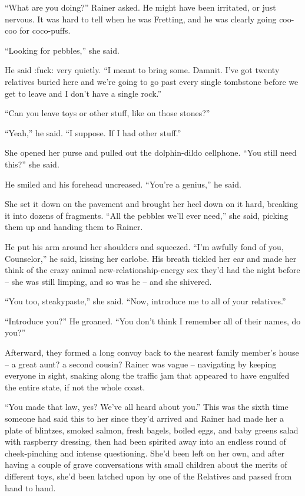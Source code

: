 “What are you doing?” Rainer asked. He might have been irritated, 
or just nervous. It was hard to tell when he was Fretting, and he was 
clearly going coo-coo for coco-puffs.

“Looking for pebbles,” she said.

He said :fuck: very quietly. “I meant to bring some. Damnit. I've got 
twenty relatives buried here and we're going to go past every single 
tombstone before we get to leave and I don't have a single rock.”

“Can you leave toys or other stuff, like on those stones?”

“Yeah,” he said. “I suppose. If I had other stuff.”

She opened her purse and pulled out the dolphin-dildo cellphone. “You 
still need this?” she said.

He smiled and his forehead uncreased. “You're a genius,” he said.

She set it down on the pavement and brought her heel down on it hard, 
breaking it into dozens of fragments. “All the pebbles we'll ever 
need,” she said, picking them up and handing them to Rainer.

He put his arm around her shoulders and squeezed. “I'm awfully fond 
of you, Counselor,” he said, kissing her earlobe. His breath tickled 
her ear and made her think of the crazy animal new-relationship-energy 
sex they'd had the night before -- she was still limping, and so was he 
-- and she shivered.

“You too, steakypaste,” she said. “Now, introduce me to all of 
your relatives.”

“Introduce you?” He groaned. “You don't think I remember all of 
their names, do you?”

\tb

Afterward, they formed a long convoy back to the nearest family 
member's house -- a great aunt? a second cousin? Rainer was vague -- 
navigating by keeping everyone in sight, snaking along the traffic jam 
that appeared to have engulfed the entire state, if not the whole coast.

“You made that law, yes? We've all heard about you.” This was the 
sixth time someone had said this to her since they'd arrived and Rainer 
had made her a plate of blintzes, smoked salmon, fresh bagels, boiled 
eggs, and baby greens salad with raspberry dressing, then had been 
spirited away into an endless round of cheek-pinching and intense 
questioning. She'd been left on her own, and after having a couple of 
grave conversations with small children about the merits of different 
toys, she'd been latched upon by one of the Relatives and passed from 
hand to hand.

